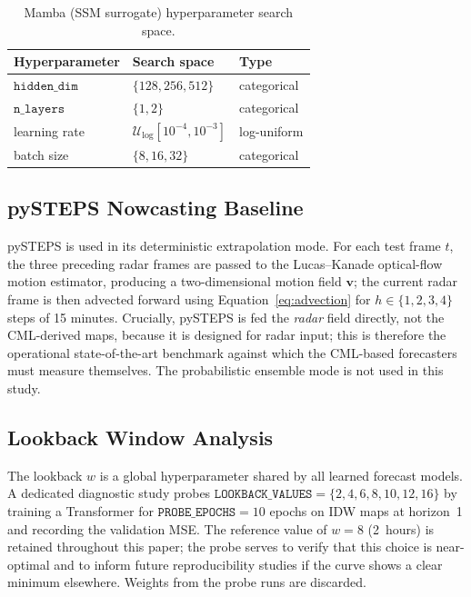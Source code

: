 \documentclass[12pt, a4paper]{article}
\begin{document}
\begin{table}[h]
\centering
\caption{Mamba (SSM surrogate) hyperparameter search space.}
\label{tab:mb_sweep}
\begin{tabular}{lll}
\toprule
Hyperparameter & Search space & Type \\
\midrule
\(\texttt{hidden\_dim}\) & \(\{128, 256, 512\}\)             & categorical \\
\(\texttt{n\_layers}\)   & \(\{1, 2\}\)                      & categorical \\
learning rate            & \(\mathcal{U}_{\log}[10^{-4}, 10^{-3}]\) & log-uniform \\
batch size               & \(\{8, 16, 32\}\)                 & categorical \\
\bottomrule
\end{tabular}
\end{table}

\subsection{pySTEPS Nowcasting Baseline}\label{sec:pysteps}

pySTEPS \cite{pulkkinen2019pysteps} is used in its deterministic
extrapolation mode. For each test frame \(t\), the three preceding
radar frames are passed to the Lucas--Kanade optical-flow motion
estimator, producing a two-dimensional motion field \(\mathbf{v}\);
the current radar frame is then advected forward using
Equation~\eqref{eq:advection} for \(h \in \{1, 2, 3, 4\}\) steps of 15
minutes. Crucially, pySTEPS is fed the \emph{radar} field directly,
not the CML-derived maps, because it is designed for radar input; this
is therefore the operational state-of-the-art benchmark against which
the CML-based forecasters must measure themselves. The probabilistic
ensemble mode is not used in this study.

\subsection{Lookback Window Analysis}

The lookback \(w\) is a global hyperparameter shared by all learned
forecast models. A dedicated diagnostic study probes
\(\texttt{LOOKBACK\_VALUES} = \{2, 4, 6, 8, 10, 12, 16\}\) by training
a Transformer for \(\texttt{PROBE\_EPOCHS} = 10\) epochs on IDW maps
at horizon~1 and recording the validation MSE. The reference value of
\(w=8\) (2~hours) is retained throughout this paper; the probe serves
to verify that this choice is near-optimal and to inform future
reproducibility studies if the curve shows a clear minimum elsewhere.
Weights from the probe runs are discarded.
\end{document}
